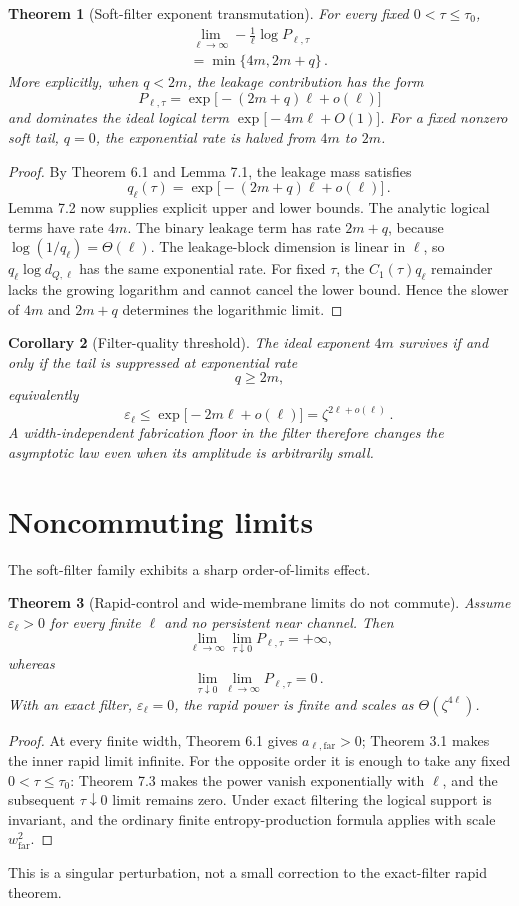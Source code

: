 \documentclass[11pt,a4paper]{article}
\newtheorem{theorem}{Theorem}[section]
\newtheorem{corollary}[theorem]{Corollary}
\theoremstyle{remark}
\begin{document}
\begin{theorem}[Soft-filter exponent transmutation]
For every fixed $0<\tau\le \tau_0$,
\[
\begin{gathered}
\lim_{\ell\to \infty}-\frac{1}{\ell}\log P_{\ell,\tau} \\
=\min\{4m,2m+q\}\mathpunct{.}
\end{gathered}
\]
More explicitly, when $q<2m$, the leakage contribution has the form
\[
P_{\ell,\tau}=\exp\bigl[-(2m+q)\ell+o(\ell)\bigr]
\]
and dominates the ideal logical term $\exp\bigl[-4m \ell+O(1)\bigr]$. For a fixed nonzero soft tail, $q=0$, the exponential rate is halved from $4m$ to $2m$.
\end{theorem}
\begin{proof}
By Theorem 6.1 and Lemma 7.1, the leakage mass satisfies
\[
q_\ell(\tau)=\exp\bigl[-(2m+q)\ell+o(\ell)\bigr]\mathpunct{.}
\]
Lemma 7.2 now supplies explicit upper and lower bounds. The analytic logical terms have rate $4m$. The binary leakage term has rate $2m+q$, because $\log(1/q_\ell)=\Theta(\ell)$. The leakage-block dimension is linear in $\ell$, so $q_\ell \log d_{Q,\ell}$ has the same exponential rate. For fixed $\tau$, the $C_1(\tau)q_\ell$ remainder lacks the growing logarithm and cannot cancel the lower bound. Hence the slower of $4m$ and $2m+q$ determines the logarithmic limit.
\end{proof}
\begin{corollary}[Filter-quality threshold]
The ideal exponent $4m$ survives if and only if the tail is suppressed at exponential rate
\[
q\ge 2m\mathpunct{,}
\]
equivalently
\[
\varepsilon_\ell\le \exp\bigl[-2m \ell+o(\ell)\bigr]=\zeta^{2\ell+o(\ell)}\mathpunct{.}
\]
A width-independent fabrication floor in the filter therefore changes the asymptotic law even when its amplitude is arbitrarily small.
\end{corollary}
\section{Noncommuting limits}
The soft-filter family exhibits a sharp order-of-limits effect.
\begin{theorem}[Rapid-control and wide-membrane limits do not commute]
Assume $\varepsilon_\ell>0$ for every finite $\ell$ and no persistent near channel. Then
\[
\lim_{\ell\to \infty} \lim_{\tau\downarrow 0} P_{\ell,\tau}=+\infty\mathpunct{,}
\]
whereas
\[
\lim_{\tau\downarrow 0} \lim_{\ell\to \infty} P_{\ell,\tau}=0\mathpunct{.}
\]
With an exact filter, $\varepsilon_\ell=0$, the rapid power is finite and scales as $\Theta(\zeta^{4\ell})$.
\end{theorem}
\begin{proof}
At every finite width, Theorem 6.1 gives $a_{\ell,\mathrm{far}}>0$; Theorem 3.1 makes the inner rapid limit infinite. For the opposite order it is enough to take any fixed $0<\tau\le \tau_0$: Theorem 7.3 makes the power vanish exponentially with $\ell$, and the subsequent $\tau\downarrow 0$ limit remains zero. Under exact filtering the logical support is invariant, and the ordinary finite entropy-production formula applies with scale $w_{\mathrm{far}}^{2}$.
\end{proof}
This is a singular perturbation, not a small correction to the exact-filter rapid theorem.
\end{document}
